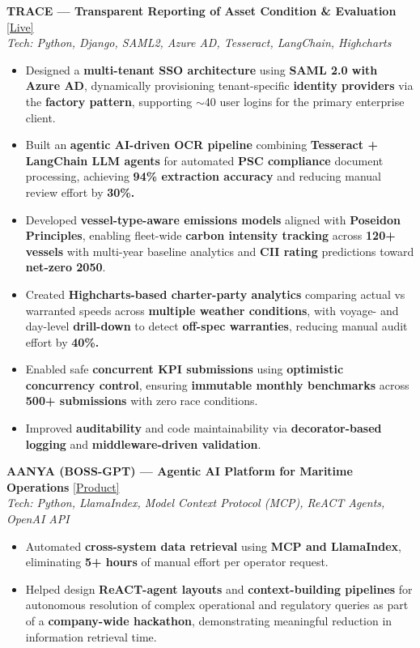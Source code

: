 \documentclass[letterpaper,9pt]{article}
\newcommand{\resumeItem}[1]{
  \item\small{#1}
}
\newcommand{\resumeItemListStart}{\begin{itemize}[leftmargin=0.18in, itemsep=0.5pt, topsep=1pt, parsep=0pt]}
\newcommand{\resumeItemListEnd}{\end{itemize}\vspace{-3pt}}
\newcommand{\mytilde}{$\sim$}
\begin{document}
      \vspace{2pt}
      \textbf{\small TRACE --- Transparent Reporting of Asset Condition \& Evaluation} \href{https://trace.bwesglobal.com/}{[Live]} \\
      \textit{\small Tech: Python, Django, SAML2, Azure AD, Tesseract, LangChain, Highcharts}
      \resumeItemListStart
        \resumeItem{Designed a \textbf{multi-tenant SSO architecture} using \textbf{SAML 2.0 with Azure AD}, dynamically provisioning tenant-specific \textbf{identity providers} via the \textbf{factory pattern}, supporting \mytilde40 user logins for the primary enterprise client.}
        \resumeItem{Built an \textbf{agentic AI-driven OCR pipeline} combining \textbf{Tesseract + LangChain LLM agents} for automated \textbf{PSC compliance} document processing, achieving \textbf{94\% extraction accuracy} and reducing manual review effort by \textbf{30\%.}}
        \resumeItem{Developed \textbf{vessel-type-aware emissions models} aligned with \textbf{Poseidon Principles}, enabling fleet-wide \textbf{carbon intensity tracking} across \textbf{120+ vessels} with multi-year baseline analytics and \textbf{CII rating} predictions toward \textbf{net-zero 2050}.}
        \resumeItem{Created \textbf{Highcharts-based charter-party analytics} comparing actual vs warranted speeds across \textbf{multiple weather conditions}, with voyage- and day-level \textbf{drill-down} to detect \textbf{off-spec warranties}, reducing manual audit effort by \textbf{40\%.}}
        \resumeItem{Enabled safe \textbf{concurrent KPI submissions} using \textbf{optimistic concurrency control}, ensuring \textbf{immutable monthly benchmarks} across \textbf{500+ submissions} with zero race conditions.}
        \resumeItem{Improved \textbf{auditability} and code maintainability via \textbf{decorator-based logging} and \textbf{middleware-driven validation}.}
      \resumeItemListEnd

      \vspace{2pt}
      \textbf{\small AANYA (BOSS-GPT) --- Agentic AI Platform for Maritime Operations} \href{https://neugenai.org/aanya/}{[Product]} \\
      \textit{\small Tech: Python, LlamaIndex, Model Context Protocol (MCP), ReACT Agents, OpenAI API}
      \resumeItemListStart
        \resumeItem{Automated \textbf{cross-system data retrieval} using \textbf{MCP and LlamaIndex}, eliminating \textbf{5+ hours} of manual effort per operator request.}
        \resumeItem{Helped design \textbf{ReACT-agent layouts} and \textbf{context-building pipelines} for autonomous resolution of complex operational and regulatory queries as part of a \textbf{company-wide hackathon}, demonstrating meaningful reduction in information retrieval time.}
      \resumeItemListEnd
\end{document}
